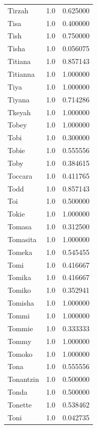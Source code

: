 \documentclass[
  letterpaper,
  DIV=11,
  numbers=noendperiod]{scrreprt}
\begin{document}
\begin{tabular}{lrr}
Tirzah          &   1.0 &   0.625000 \\
Tisa            &   1.0 &   0.400000 \\
Tish            &   1.0 &   0.750000 \\
Tisha           &   1.0 &   0.056075 \\
Titiana         &   1.0 &   0.857143 \\
Titianna        &   1.0 &   1.000000 \\
Tiya            &   1.0 &   1.000000 \\
Tiyana          &   1.0 &   0.714286 \\
Tkeyah          &   1.0 &   1.000000 \\
Tobey           &   1.0 &   1.000000 \\
Tobi            &   1.0 &   0.300000 \\
Tobie           &   1.0 &   0.555556 \\
Toby            &   1.0 &   0.384615 \\
Toccara         &   1.0 &   0.411765 \\
Todd            &   1.0 &   0.857143 \\
Toi             &   1.0 &   0.500000 \\
Tokie           &   1.0 &   1.000000 \\
Tomasa          &   1.0 &   0.312500 \\
Tomasita        &   1.0 &   1.000000 \\
Tomeka          &   1.0 &   0.545455 \\
Tomi            &   1.0 &   0.416667 \\
Tomika          &   1.0 &   0.416667 \\
Tomiko          &   1.0 &   0.352941 \\
Tomisha         &   1.0 &   1.000000 \\
Tommi           &   1.0 &   1.000000 \\
Tommie          &   1.0 &   0.333333 \\
Tommy           &   1.0 &   1.000000 \\
Tomoko          &   1.0 &   1.000000 \\
Tona            &   1.0 &   0.555556 \\
Tonantzin       &   1.0 &   0.500000 \\
Tonda           &   1.0 &   0.500000 \\
Tonette         &   1.0 &   0.538462 \\
Toni            &   1.0 &   0.042735 \\

\end{tabular}
\end{document}
